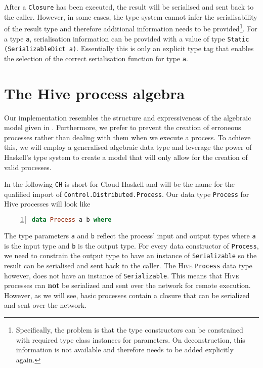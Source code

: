 After a \texttt{Closure} has been executed, the result will be serialised and sent back to the caller. However, in some cases, the type system cannot infer the serialisability of the result type and therefore additional information needs to be provided\footnote{Specifically, the problem is that the type constructors can be constrained with required type class instances for parameters. On deconstruction, this information is not available and therefore needs to be added explicitly again.}. For a type \texttt{a}, serialisation information can be provided with a value of type \texttt{Static (SerializableDict a)}. Essentially this is only an explicit type tag that enables the selection of the correct serialisation function for type \texttt{a}.

\section{The Hive process algebra}
Our implementation resembles the structure and expressiveness of the algebraic model given in . Furthermore, we prefer to prevent the creation of erroneous processes rather than dealing with them when we execute a process. To achieve this, we will employ a generalised algebraic data type and leverage the power of Haskell's type system to create a model that will only allow for the creation of valid processes.

In the following \texttt{CH} is short for Cloud Haskell and will be the name for the qualified import of \texttt{Control.Distributed.Process}. Our data type \texttt{Process} for Hive processes will look like
\begin{lstlisting}[language=Haskell,caption=Data type for \textsc{Hive} processes.,numbers=left,frame=bt]
data Process a b where
\end{lstlisting}
The type parameters \texttt{a} and \texttt{b} reflect the process' input and output types where \texttt{a} is the input type and \texttt{b} is the output type. For every data constructor of \texttt{Process}, we need to constrain the output type to have an instance of \texttt{Serializable} so the result can be serialised and sent back to the caller. The \textsc{Hive} \texttt{Process} data type however, does not have an instance of \texttt{Serializable}. This means that \textsc{Hive} processes can \textbf{not} be serialized and sent over the network for remote execution. However, as we will see, basic processes contain a closure that can be serialized and sent over the network.

